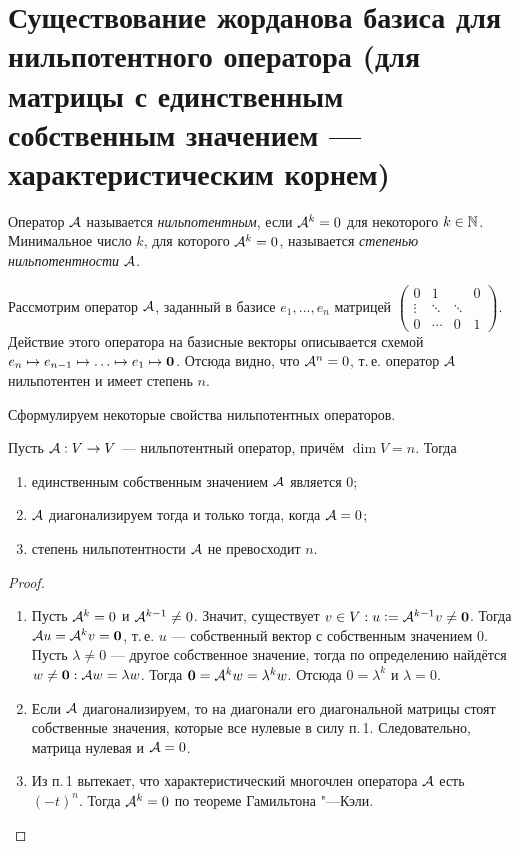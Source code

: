 \section{Существование жорданова базиса для нильпотентного оператора (для матрицы с единственным собственным значением --- характеристическим корнем)}

\begin{definition}
    Оператор $\mathcal{A}$ называется \textit{нильпотентным}, если $\mathcal{A}^k = 0$ для некоторого $k \in \mathbb{N}$. Минимальное число $k$, для которого $\mathcal{A}^k = 0$, называется \textit{степенью нильпотентности} $\mathcal{A}$.
\end{definition}

\begin{example}
    Рассмотрим оператор $\mathcal{A}$, заданный в базисе $e_1, \ldots, e_n$ матрицей
    $
    \begin{pmatrix}
        0 & 1 & & 0\\
        \vdots & \ddots & \ddots & \\
        0 & \cdots & 0 & 1
    \end{pmatrix}
    $. Действие этого оператора на базисные векторы описывается схемой $e_n \mapsto e_{n - 1} \mapsto \ldots \mapsto e_1 \mapsto \boldsymbol{0}$. Отсюда видно, что $\mathcal{A}^n = 0$, т.\,е. оператор $\mathcal{A}$ нильпотентен и имеет степень $n$.
\end{example}

Сформулируем некоторые свойства нильпотентных операторов.

\begin{proposal}
    Пусть $\mathcal{A}: V \to V$ --- нильпотентный оператор, причём $\dim V = n$. Тогда
    \begin{enumerate}[nolistsep]
        \item единственным собственным значением $\mathcal{A}$ является $0$;
        \item $\mathcal{A}$ диагонализируем тогда и только тогда, когда $\mathcal{A} = 0$;
        \item степень нильпотентности $\mathcal{A}$ не превосходит $n$.
    \end{enumerate}
\end{proposal}

\begin{proof}
    \begin{enumerate}
        \item Пусть $\mathcal{A}^k = 0$ и $\mathcal{A}^{k - 1} \ne 0$. Значит, существует $v \in V: u \vcentcolon = \mathcal{A}^{k - 1}v \ne \boldsymbol{0}$. Тогда $\mathcal{A} u = \mathcal{A}^kv = \boldsymbol{0}$, т.\,е. $u$ --- собственный вектор с собственным значением $0$. Пусть $\lambda \ne 0$ --- другое собственное значение, тогда по определению найдётся $w \ne \boldsymbol{0}: \mathcal{A} w = \lambda w$. Тогда $\boldsymbol{0} = \mathcal{A}^kw = \lambda^kw$. Отсюда $0 = \lambda^k$ и $\lambda = 0$.
        \item Если $\mathcal{A}$ диагонализируем, то на диагонали его диагональной матрицы стоят собственные значения, которые все нулевые в силу п.\,1. Следовательно, матрица нулевая и $\mathcal{A} = 0$.
        \item Из п.\,1 вытекает, что характеристический многочлен оператора $\mathcal{A}$ есть $(-t)^n$. Тогда $\mathcal{A}^k = 0$ по теореме Гамильтона "---Кэли.
    \end{enumerate}
\end{proof}

